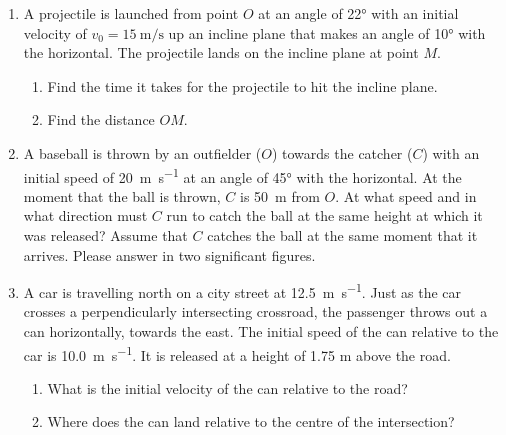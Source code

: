 \begin{multicols}{2}
\begin{enumerate}[leftmargin=12pt]
  \item A projectile is launched from point $O$ at an angle of \ang{22} with
    an initial velocity of $v_0=\SI{15}{\metre\per\second}$ up an incline plane
    that makes an angle of \ang{10} with the horizontal. The projectile lands on
    the incline plane at point $M$.
    \begin{center}
    \end{center}
    \begin{enumerate}
      \item Find the time it takes for the projectile to hit the incline plane.
      \item Find the distance $OM$.
    \end{enumerate}
    
  \item A baseball is thrown by an outfielder ($O$) towards the catcher
    ($C$) with an initial speed of \SI{20}{\metre\per\second} at an angle of
    \ang{45} with the horizontal. At the moment that the ball is thrown, $C$ is
    \SI{50}{\metre} from $O$. At what speed and in what direction must $C$ run
    to catch the ball at the same height at which it was released? Assume that
    $C$ catches the ball at the same moment that it arrives. Please answer in
    two significant figures.

  \item A car is travelling north on a city street at
    \SI{12.5}{\metre\per\second}. Just as the car crosses a perpendicularly
    intersecting crossroad, the passenger throws out a can horizontally, towards
    the east. The initial speed of the can relative to the car is
    \SI{10.0}{\metre\per\second}. It is released at a height of 1.75 m above the
    road.
    \begin{enumerate}
      \item What is the initial velocity of the can relative to the road?
      \item Where does the can land relative to the centre of the intersection?
    \end{enumerate}
  

\end{enumerate}
\end{multicols}
